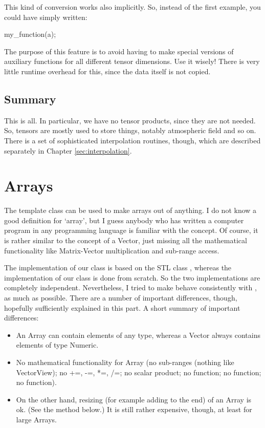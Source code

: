 This kind of conversion works also implicitly. So, instead of the
first example, you could have simply written:
\begin{code}
my_function(a);
\end{code}

The purpose of this feature is to avoid having to make special
versions of auxiliary functions for all different tensor
dimensions. Use it wisely! There is very little runtime overhead for
this, since the data itself is not copied.

\subsection{Summary}

This is all. In particular, we have no tensor products, since they
are not needed. So, tensors are mostly used to store things, notably
atmospheric field and so on.  There is a set of sophisticated
interpolation routines, though, which are described separately in
Chapter \ref{sec:interpolation}.


\section{Arrays}
\label{sec:matpack:arrays}

The template class  can be used to make arrays out of
anything. I do not know a good definition for `array', but I guess
anybody who has written a computer program in any programming language
is familiar with the concept. Of course, it is rather similar to the
concept of a Vector, just missing all the mathematical functionality
like Matrix-Vector multiplication and sub-range access.

The implementation of our  class is based on the STL class
, whereas the implementation of our 
class is done from scratch. So the two implementations are completely
independent. Nevertheless, I tried to make  behave
consistently with , as much as possible. There are a number
of important differences, though, hopefully sufficiently explained in
this part. A short summary of important differences:

\begin{itemize}
\item An Array can contain elements of any type, whereas a Vector
  always contains elements of type Numeric.
\item No mathematical functionality for Array (no sub-ranges (nothing
  like VectorView); no +=, -=, *=, /=; no scalar product; no
   function; no  function; no
   function).
\item On the other hand, resizing (for example adding to the end) of
  an Array is ok. (See the  method below.) It is still
  rather expensive, though, at least for large Arrays. 
\end{itemize}

